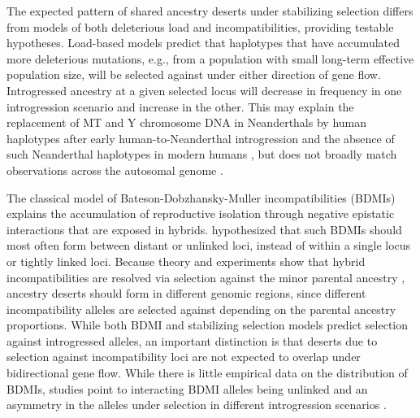\documentclass{article}
\begin{document}
The expected pattern of shared ancestry deserts under stabilizing selection
differs from models of both deleterious load and incompatibilities, providing
testable hypotheses. Load-based models predict that haplotypes that have
accumulated more deleterious mutations, e.g., from a population with small
long-term effective population size, will be selected against under either
direction of gene flow. Introgressed ancestry at a given selected locus will
decrease in frequency in one introgression scenario and increase in the other.
This may explain the replacement of MT and Y chromosome DNA in Neanderthals by
human haplotypes after early human-to-Neanderthal introgression and the absence
of such Neanderthal haplotypes in modern humans \citep{posth2017deeply,
petr2020evolutionary}, but does not broadly match observations across the
autosomal genome \citep{harris2023diverse}.

The classical model of Bateson-Dobzhansky-Muller incompatibilities (BDMIs)
\citep{bateson1909heredity, dobzhansky1936studies, muller1942isolating}
explains the accumulation of reproductive isolation through negative epistatic
interactions that are exposed in hybrids. \citet{muller1942isolating}
hypothesized that such BDMIs should most often form between distant or unlinked
loci, instead of within a single locus or tightly linked loci. Because theory
and experiments show that hybrid incompatibilities are resolved via selection
against the minor parental ancestry \citep{matute2020rapid, moran2021genomic},
ancestry deserts should form in different genomic regions, since different
incompatibility alleles are selected against depending on the parental ancestry
proportions. While both BDMI and stabilizing selection models predict selection
against introgressed alleles, an important distinction is that deserts due to
selection against incompatibility loci are not expected to overlap under
bidirectional gene flow. While there is little empirical data on the
distribution of BDMIs, studies point to interacting BDMI alleles being unlinked
\citep{presgraves2003fine, li2022imbalanced} and an asymmetry in the alleles
under selection in different introgression scenarios
\citep{maheshwari2011genetics, moran2021genomic}.
\end{document}
